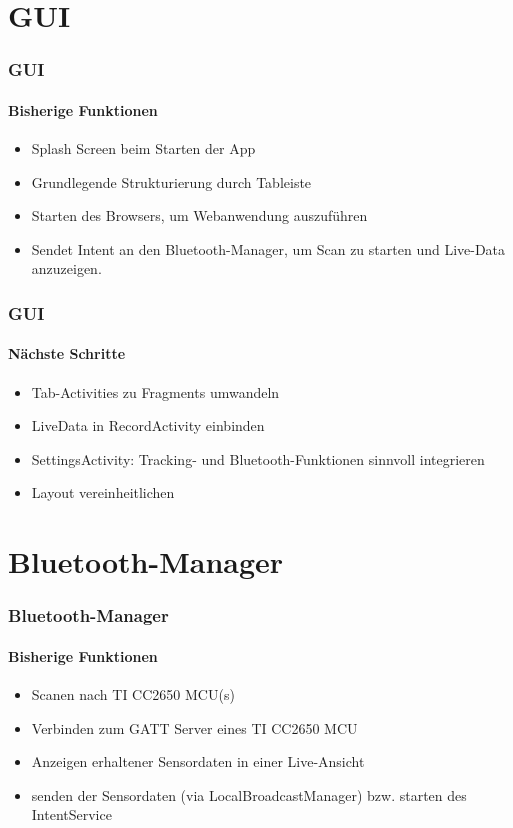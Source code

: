 \documentclass{beamer}
\begin{document}


\section{GUI}

\begin{frame}
\frametitle{GUI}
\framesubtitle{Bisherige Funktionen}
\begin{itemize}
  \item Splash Screen beim Starten der App
  \item Grundlegende Strukturierung durch Tableiste
  \item Starten des Browsers, um Webanwendung auszuf\"uhren
  \item Sendet Intent an den Bluetooth-Manager, um Scan zu starten und Live-Data anzuzeigen.
\end{itemize}
\end{frame}

\begin{frame}
\frametitle{GUI}
\framesubtitle{N\"achste Schritte}
\begin{itemize}
  \item Tab-Activities zu Fragments umwandeln
  \item LiveData in RecordActivity einbinden
  \item SettingsActivity: Tracking- und Bluetooth-Funktionen sinnvoll integrieren
  \item Layout vereinheitlichen
\end{itemize}
\end{frame}


\section{Bluetooth-Manager}


\begin{frame}
\frametitle{Bluetooth-Manager}
\framesubtitle{Bisherige Funktionen}
\begin{itemize}
  \item Scanen nach TI CC2650 MCU(s)
  \item Verbinden zum GATT Server eines TI CC2650 MCU
  \item Anzeigen erhaltener Sensordaten in einer Live-Ansicht
  \item senden der Sensordaten (via LocalBroadcastManager) bzw. starten des IntentService
\end{itemize}
\end{frame}
\end{document}
